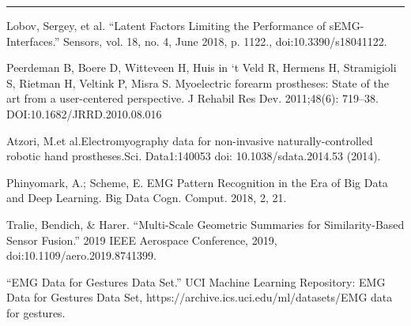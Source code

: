 \documentclass[11pt]{article}
\begin{document}
\begin{center}
\noindent\rule{16cm}{0.4pt}
\end{center}


\begin{thebibliography}{5}

 Lobov, Sergey, et al. “Latent Factors Limiting the Performance of sEMG-Interfaces.” Sensors, vol. 18, no. 4, June 2018, p. 1122., doi:10.3390/s18041122.

 Peerdeman  B,  Boere  D,  Witteveen  H,  Huis  in  ‘t  Veld  R,  Hermens H, Stramigioli S, Rietman H, Veltink P, Misra S. Myoelectric  forearm  prostheses:  State  of  the  art  from  a  user-centered perspective. J Rehabil Res Dev. 2011;48(6): 719–38. DOI:10.1682/JRRD.2010.08.016

 Atzori, M.et al.Electromyography data for non-invasive naturally-controlled robotic hand prostheses.Sci. Data1:140053 doi: 10.1038/sdata.2014.53 (2014).

 Phinyomark, A.; Scheme, E. EMG Pattern Recognition in the Era of Big Data and Deep Learning. Big Data Cogn. Comput. 2018, 2, 21. 

 Tralie, Bendich, \& Harer. “Multi-Scale Geometric Summaries for Similarity-Based Sensor Fusion.” 2019 IEEE Aerospace Conference, 2019, doi:10.1109/aero.2019.8741399.

 “EMG Data for Gestures Data Set.” UCI Machine Learning Repository: EMG Data for Gestures Data Set, https://archive.ics.uci.edu/ml/datasets/EMG data for gestures.

\end{thebibliography}
  
\end{document}
